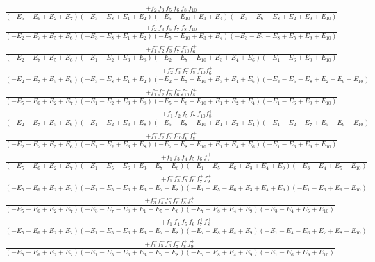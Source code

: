 \documentclass{article}
\begin{document}
\[\begin{array}{rcl}
\frac{+f_{2}^{-}f_{3}^{-}f_{5}^{-}f_{6}^{-}f_{8}^{-}f_{10}^{-}}{(-E_{5}-E_{6}+E_{2}+E_{7})(-E_{3}-E_{8}+E_{1}+E_{2})(-E_{5}-E_{10}+E_{3}+E_{4})(-E_{3}-E_{6}-E_{8}+E_{2}+E_{9}+E_{10})}\\
\frac{+f_{2}^{-}f_{3}^{-}f_{5}^{-}f_{7}^{-}f_{8}^{-}f_{10}^{-}}{(-E_{2}-E_{7}+E_{5}+E_{6})(-E_{3}-E_{8}+E_{1}+E_{2})(-E_{5}-E_{10}+E_{3}+E_{4})(-E_{3}-E_{7}-E_{8}+E_{5}+E_{9}+E_{10})}\\
\frac{+f_{1}^{-}f_{2}^{-}f_{3}^{-}f_{7}^{-}f_{10}^{-}f_{6}^{+}}{(-E_{2}-E_{7}+E_{5}+E_{6})(-E_{1}-E_{2}+E_{3}+E_{8})(-E_{2}-E_{7}-E_{10}+E_{3}+E_{4}+E_{6})(-E_{1}-E_{6}+E_{9}+E_{10})}\\
\frac{+f_{2}^{-}f_{3}^{-}f_{7}^{-}f_{8}^{-}f_{10}^{-}f_{6}^{+}}{(-E_{2}-E_{7}+E_{5}+E_{6})(-E_{3}-E_{8}+E_{1}+E_{2})(-E_{2}-E_{7}-E_{10}+E_{3}+E_{4}+E_{6})(-E_{3}-E_{6}-E_{8}+E_{2}+E_{9}+E_{10})}\\
\frac{+f_{1}^{-}f_{2}^{-}f_{5}^{-}f_{6}^{-}f_{10}^{-}f_{8}^{+}}{(-E_{5}-E_{6}+E_{2}+E_{7})(-E_{1}-E_{2}+E_{3}+E_{8})(-E_{5}-E_{8}-E_{10}+E_{1}+E_{2}+E_{4})(-E_{1}-E_{6}+E_{9}+E_{10})}\\
\frac{+f_{1}^{-}f_{2}^{-}f_{5}^{-}f_{7}^{-}f_{10}^{-}f_{8}^{+}}{(-E_{2}-E_{7}+E_{5}+E_{6})(-E_{1}-E_{2}+E_{3}+E_{8})(-E_{5}-E_{8}-E_{10}+E_{1}+E_{2}+E_{4})(-E_{1}-E_{2}-E_{7}+E_{5}+E_{9}+E_{10})}\\
\frac{+f_{1}^{-}f_{2}^{-}f_{7}^{-}f_{10}^{-}f_{6}^{+}f_{8}^{+}}{(-E_{2}-E_{7}+E_{5}+E_{6})(-E_{1}-E_{2}+E_{3}+E_{8})(-E_{7}-E_{8}-E_{10}+E_{1}+E_{4}+E_{6})(-E_{1}-E_{6}+E_{9}+E_{10})}\\
\frac{+f_{1}^{-}f_{3}^{-}f_{4}^{-}f_{5}^{-}f_{6}^{-}f_{7}^{+}}{(-E_{5}-E_{6}+E_{2}+E_{7})(-E_{1}-E_{5}-E_{6}+E_{3}+E_{7}+E_{8})(-E_{1}-E_{5}-E_{6}+E_{3}+E_{4}+E_{9})(-E_{3}-E_{4}+E_{5}+E_{10})}\\
\frac{+f_{1}^{-}f_{3}^{-}f_{5}^{-}f_{6}^{-}f_{7}^{+}f_{9}^{+}}{(-E_{5}-E_{6}+E_{2}+E_{7})(-E_{1}-E_{5}-E_{6}+E_{3}+E_{7}+E_{8})(-E_{1}-E_{5}-E_{6}+E_{3}+E_{4}+E_{9})(-E_{1}-E_{6}+E_{9}+E_{10})}\\
\frac{+f_{3}^{-}f_{4}^{-}f_{5}^{-}f_{6}^{-}f_{8}^{-}f_{7}^{+}}{(-E_{5}-E_{6}+E_{2}+E_{7})(-E_{3}-E_{7}-E_{8}+E_{1}+E_{5}+E_{6})(-E_{7}-E_{8}+E_{4}+E_{9})(-E_{3}-E_{4}+E_{5}+E_{10})}\\
\frac{+f_{1}^{-}f_{4}^{-}f_{5}^{-}f_{6}^{-}f_{7}^{+}f_{8}^{+}}{(-E_{5}-E_{6}+E_{2}+E_{7})(-E_{1}-E_{5}-E_{6}+E_{3}+E_{7}+E_{8})(-E_{7}-E_{8}+E_{4}+E_{9})(-E_{1}-E_{4}-E_{6}+E_{7}+E_{8}+E_{10})}\\
\frac{+f_{1}^{-}f_{5}^{-}f_{6}^{-}f_{7}^{+}f_{8}^{+}f_{9}^{+}}{(-E_{5}-E_{6}+E_{2}+E_{7})(-E_{1}-E_{5}-E_{6}+E_{3}+E_{7}+E_{8})(-E_{7}-E_{8}+E_{4}+E_{9})(-E_{1}-E_{6}+E_{9}+E_{10})}\\

\end{array}\]
\end{document}
